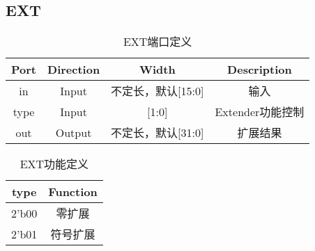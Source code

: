 \documentclass[UTF8]{ctexart}
\begin{document}
\subsection{EXT}
\begin{table}[H]
	\centering
	\begin{threeparttable}
		\caption{EXT端口定义}
		\begin{tabular}{cccc}
			\toprule
			\rowcolor{mypink}
			\textbf{Port} & \textbf{Direction} & \textbf{Width}     & \textbf{Description} \\
			\midrule
			in            & Input              & 不定长，默认[15:0] & 输入                 \\
			\midrule
			type          & Input              & [1:0]              & Extender功能控制     \\
			\midrule
			out           & Output             & 不定长，默认[31:0] & 扩展结果             \\
			\midrule
		\end{tabular}
	\end{threeparttable}
\end{table}
\begin{table}[H]
	\centering
	\begin{threeparttable}
		\caption{EXT功能定义}
		\begin{tabular}{cc}
			\toprule
			\rowcolor{mypink}
			\textbf{type} & \textbf{Function} \\
			\midrule
			2'b00         & 零扩展            \\
			\midrule
			2'b01         & 符号扩展          \\
			\midrule
		\end{tabular}
	\end{threeparttable}
\end{table}
\newpage
\end{document}
